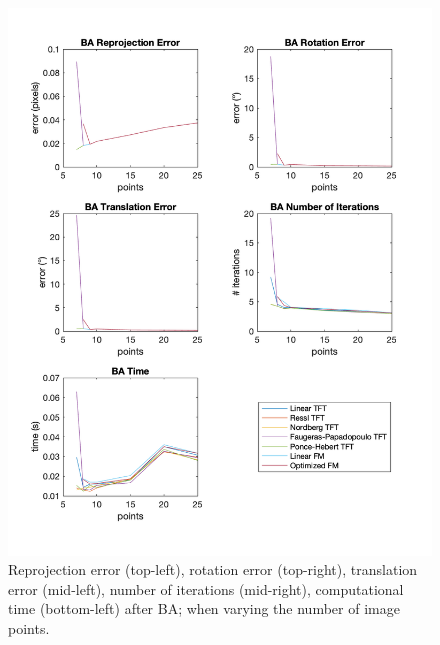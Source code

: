 \begin{figure}[p]
	\centering
	\includegraphics[width=1\textwidth]{Experiments/Synthetic/points/BApointsPlots.png}
	\caption[Synthetic Trial varying Number of Image Points with \acs{BA}]{Reprojection error (top-left), rotation error (top-right), translation error (mid-left), number of iterations (mid-right), computational time (bottom-left) after \acs{BA}; when varying the number of image points.}
	\label{fig:BAPointsPlot}
\end{figure}

